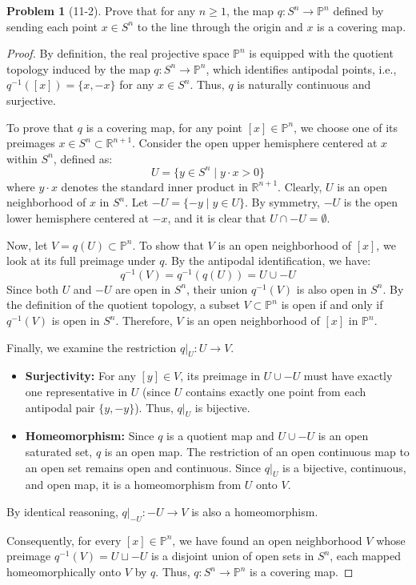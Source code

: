\documentclass[11pt, a4paper]{article}
\theoremstyle{definition}
\newtheorem{prob}{Problem}
\newenvironment{problem}[1][]{\begin{prob}[#1]\normalfont}{\end{prob}\vspace{1.5em}}
\begin{document}
\begin{problem}[11-2]
Prove that for any $n \geq 1$, the map $q: S^n \to \mathbb{P}^n$ defined by sending each point $x \in S^n$ to the 
line 
through the origin and $x$ is a covering map. 

\begin{proof}
By definition, the real projective space $\mathbb{P}^n$ is equipped with the quotient topology induced by the map 
$q: S^n \to \mathbb{P}^n$, which identifies antipodal points, i.e., $q^{-1}([x]) = \{x, -x\}$ for any $x \in S^n$. 
Thus, $q$ is naturally continuous and surjective.

To prove that $q$ is a covering map, for any point $[x] \in \mathbb{P}^n$, we choose one of its preimages 
$x \in S^n \subset \mathbb{R}^{n+1}$. Consider the open upper hemisphere centered at $x$ within $S^n$, defined 
as:
$$ U = \{ y \in S^n \mid y \cdot x > 0 \} $$
where $y \cdot x$ denotes the standard inner product in $\mathbb{R}^{n+1}$. Clearly, $U$ is an open neighborhood 
of $x$ in $S^n$. Let $-U = \{ -y \mid y \in U \}$. By symmetry, $-U$ is the open lower hemisphere centered at 
$-x$, and it is clear that $U \cap -U = \emptyset$.

Now, let $V = q(U) \subset \mathbb{P}^n$. To show that $V$ is an open neighborhood of $[x]$, we look at its full 
preimage under $q$. By the antipodal identification, we have:
$$ q^{-1}(V) = q^{-1}(q(U)) = U \cup -U $$
Since both $U$ and $-U$ are open in $S^n$, their union $q^{-1}(V)$ is also open in $S^n$. By the definition of 
the quotient topology, a subset $V \subset \mathbb{P}^n$ is open if and only if $q^{-1}(V)$ is open in $S^n$. 
Therefore, $V$ is an open neighborhood of $[x]$ in $\mathbb{P}^n$.

Finally, we examine the restriction $q|_U: U \to V$. 
\begin{itemize}
    \item[$1^\circ$] \textbf{Surjectivity:} For any $[y] \in V$, its preimage in $U \cup -U$ must have exactly one
     representative in $U$ (since $U$ contains exactly one point from each antipodal pair $\{y, -y\}$). Thus, 
     $q|_U$ is bijective.
    \item[$2^\circ$] \textbf{Homeomorphism:} Since $q$ is a quotient map and $U \cup -U$ is an open saturated set, 
    $q$ is an open map. The restriction of an open continuous map to an open set remains open and continuous. 
    Since $q|_U$ is a bijective, continuous, and open map, it is a homeomorphism from $U$ onto $V$.
\end{itemize}
By identical reasoning, $q|_{-U}: -U \to V$ is also a homeomorphism. 

Consequently, for every $[x] \in \mathbb{P}^n$, we have found an open neighborhood $V$ whose preimage 
$q^{-1}(V) = U \sqcup -U$ is a disjoint union of open sets in $S^n$, each mapped homeomorphically onto $V$ by $q$. 
Thus, $q: S^n \to \mathbb{P}^n$ is a covering map.

\end{proof}
\end{problem}
\end{document}
